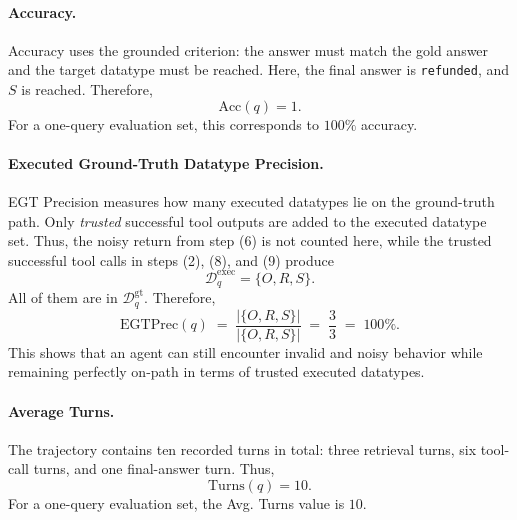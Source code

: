 \paragraph{Accuracy.}
Accuracy uses the grounded criterion: the answer must match the gold answer and the target datatype must be reached. 
Here, the final answer is \texttt{refunded}, and $S$ is reached. 
Therefore,
\begin{equation}
\mathrm{Acc}(q)=1.
\end{equation}
For a one-query evaluation set, this corresponds to $100\%$ accuracy.

\paragraph{Executed Ground-Truth Datatype Precision.}
EGT Precision measures how many executed datatypes lie on the ground-truth path.
Only \emph{trusted} successful tool outputs are added to the executed datatype set.
Thus, the noisy return from step (6) is not counted here, while the trusted successful tool calls in steps (2), (8), and (9) produce
\begin{equation}
\mathcal{D}^{\mathrm{exec}}_q = \{O,R,S\}.
\end{equation}
All of them are in $\mathcal{D}^{\mathrm{gt}}_q$.
Therefore,
\begin{equation}
\mathrm{EGTPrec}(q)
\;=\; \frac{|\{O,R,S\}|}{|\{O,R,S\}|}
\;=\; \frac{3}{3}
\;=\; 100\%.
\end{equation}
This shows that an agent can still encounter invalid and noisy behavior while remaining perfectly on-path in terms of trusted executed datatypes.

\paragraph{Average Turns.}
The trajectory contains ten recorded turns in total: three retrieval turns, six tool-call turns, and one final-answer turn.
Thus,
\begin{equation}
\mathrm{Turns}(q)=10.
\end{equation}
For a one-query evaluation set, the Avg. Turns value is $10$.

